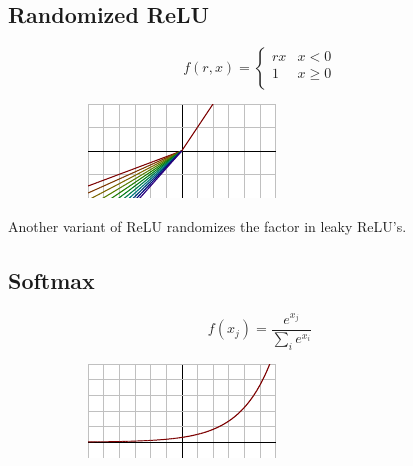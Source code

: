 \subsection*{Randomized ReLU}

\begin{figure}[H]
\raggedright
\begin{subfigure}{.35\textwidth}
  \centering
  \[
f(r, x) = \begin{cases}
       rx & x < 0 \\
       1 & x \geq 0 \\
     \end{cases} \] 
\end{subfigure}%
\begin{subfigure}{.25\textwidth}
  \centering
  \includegraphics[width=\textwidth]{tex/images/activation/rlrelu}
\end{subfigure}
\end{figure}

\noindent
Another variant of ReLU randomizes the factor in leaky ReLU's.

\subsection*{Softmax}
\label{subsection:softmax}

\begin{figure}[H]
\raggedright
\begin{subfigure}{.25\textwidth}
  \centering
  \[ f(x_j) = \frac{e^{x_j}}{\sum_i e^{x_i}} \]
\end{subfigure}%
\begin{subfigure}{.25\textwidth}
  \centering
  \includegraphics[width=\textwidth]{tex/images/activation/softmax}
\end{subfigure}
\end{figure}

